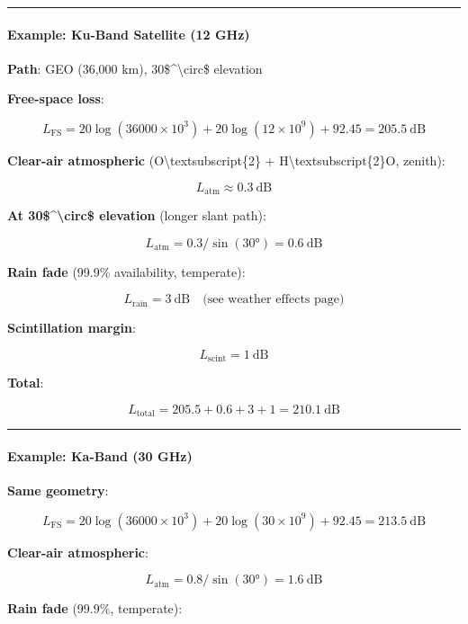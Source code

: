 \begin{center}\rule{0.5\linewidth}{0.5pt}\end{center}

\paragraph{Example: Ku-Band Satellite (12
GHz)}\label{example-ku-band-satellite-12-ghz}

\textbf{Path}: GEO (36,000 km), 30\$\^{}\textbackslash circ\$ elevation

\textbf{Free-space loss}:

\[
L_{\text{FS}} = 20\log(36000 \times 10^3) + 20\log(12 \times 10^9) + 92.45 = 205.5\ \text{dB}
\]

\textbf{Clear-air atmospheric} (O\textbackslash textsubscript\{2\} +
H\textbackslash textsubscript\{2\}O, zenith):

\[
L_{\text{atm}} \approx 0.3\ \text{dB}
\]

\textbf{At 30\$\^{}\textbackslash circ\$ elevation} (longer slant path):

\[
L_{\text{atm}} = 0.3 / \sin(30°) = 0.6\ \text{dB}
\]

\textbf{Rain fade} (99.9\% availability, temperate):

\[
L_{\text{rain}} = 3\ \text{dB} \quad \text{(see weather effects page)}
\]

\textbf{Scintillation margin}:

\[
L_{\text{scint}} = 1\ \text{dB}
\]

\textbf{Total}:

\[
L_{\text{total}} = 205.5 + 0.6 + 3 + 1 = 210.1\ \text{dB}
\]

\begin{center}\rule{0.5\linewidth}{0.5pt}\end{center}

\paragraph{Example: Ka-Band (30 GHz)}\label{example-ka-band-30-ghz}

\textbf{Same geometry}:

\[
L_{\text{FS}} = 20\log(36000 \times 10^3) + 20\log(30 \times 10^9) + 92.45 = 213.5\ \text{dB}
\]

\textbf{Clear-air atmospheric}:

\[
L_{\text{atm}} = 0.8 / \sin(30°) = 1.6\ \text{dB}
\]

\textbf{Rain fade} (99.9\%, temperate):

